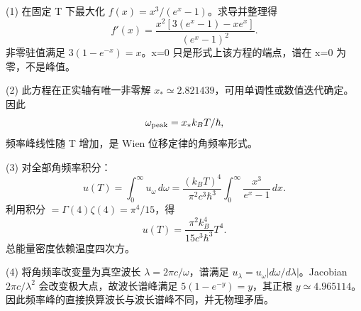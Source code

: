 (1) 在固定 T 下最大化 \(f(x)=x^3/(e^x-1)\)。求导并整理得
\[
f'(x)=\frac{x^2[3(e^x-1)-xe^x]}{(e^x-1)^2}.
\]
非零驻值满足 \(3(1-e^{-x})=x\)。x=0 只是形式上该方程的端点，谱在 x=0 为零，不是峰值。

(2) 此方程在正实轴有唯一非零解 \(x_*\simeq2.821439\)，可用单调性或数值迭代确定。因此
\[
\omega_{\rm peak}=x_*k_BT/\hbar,
\]
频率峰线性随 T 增加，是 Wien 位移定律的角频率形式。

(3) 对全部角频率积分：
\[
u(T)=\int_0^\infty u_\omega\,d\omega
=\frac{(k_BT)^4}{\pi^2c^3\hbar^3}
\int_0^\infty\frac{x^3}{e^x-1}\,dx.
\]
利用积分 \(=\Gamma(4)\zeta(4)=\pi^4/15\)，得
\[
u(T)=\frac{\pi^2k_B^4}{15c^3\hbar^3}T^4.
\]
总能量密度依赖温度四次方。

(4) 将角频率改变量为真空波长 \(\lambda=2\pi c/\omega\)，谱满足 \(u_\lambda=u_\omega|d\omega/d\lambda|\)。Jacobian \(2\pi c/\lambda^2\) 会改变极大点，故波长谱峰满足 \(5(1-e^{-y})=y\)，其正根 \(y\simeq4.965114\)。因此频率峰的直接换算波长与波长谱峰不同，并无物理矛盾。
